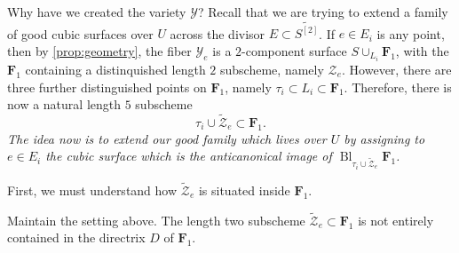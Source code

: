 \documentclass[12pt,reqno]{amsart}
\DeclareMathOperator{\Bl}{Bl}
\numberwithin{equation}{section}
\newcommand{\F}{\mathbf F}
\newcommand{\td}{\widetilde}
\begin{document}
Why have we created the variety $\mathcal{Y}$? Recall that we are
trying to extend a family of good cubic surfaces over $U$ across the
divisor $E \subset \td{S^{[2]}}$. If $e \in E_{i}$ is any point, then
by \autoref{prop:geometry}, the fiber $\mathcal{Y}_{e}$ is a
$2$-component surface $S \cup_{L_{i}} \F_{1}$, with the $\F_{1}$
containing a distinquished length $2$ subscheme, namely
$\mathcal{Z}_{e}$. However, there are three further distinguished
points on $\F_{1}$, namely $\tau_{i} \subset L_{i} \subset \F_{1}$.
Therefore, there is now a natural length $5$ subscheme
\[\tau_{i} \cup \td{\mathcal{Z}}_{e} \subset \F_{1}.\]
{\sl The idea now is to extend our good family which lives over $U$ by
  assigning to $e \in E_{i}$ the cubic surface which is the
  anticanonical image of
  $\Bl_{\tau_{i} \cup \td{\mathcal{Z}}_{e}}\F_{1}$.}

First, we must understand how $\td{\mathcal{Z}}_{e}$ is situated
inside $\F_{1}$.

\begin{proposition}
  \label{prop:nodirectrix} Maintain the setting above.  The length two
  subscheme $\td{\mathcal{Z}}_{e} \subset \F_{1}$ is not entirely
  contained in the directrix $D$ of $\F_{1}$.
\end{proposition}
\end{document}
